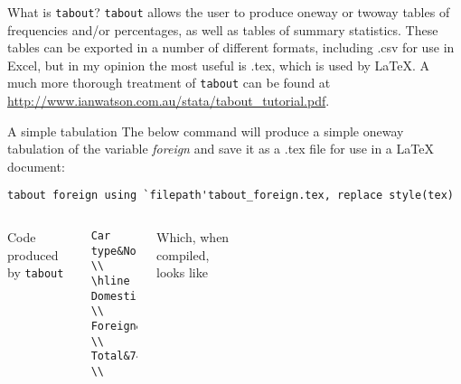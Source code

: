 \documentclass[fleqn, handout, 10pt]{beamer}
\def\results{S:/trainings/exporting_stata_tables_figures/results}
\def\lst{\lstinline}
\begin{document}
\begin{frame}[fragile]{What is \lst=tabout=?}
     \lst=tabout= allows the user to produce oneway or twoway tables of frequencies and/or percentages, as well as tables of summary statistics. These tables can be exported in a number of different formats, including .csv for use in Excel, but in my opinion the most useful is .tex, which is used by \LaTeX{}. A much more thorough treatment of \lst=tabout= can be found at \url{http://www.ianwatson.com.au/stata/tabout_tutorial.pdf}.
\end{frame}

\begin{frame}[fragile]{A simple tabulation}
    The below command will produce a simple oneway tabulation of the variable \emph{foreign} and save it as a .tex file for use in a \LaTeX{} document: \\
    \vspace{.25cm}
    \begin{lstlisting}
tabout foreign using `filepath'tabout_foreign.tex, replace style(tex)
    \end{lstlisting}
\pause
    \vspace{.25cm}
    \begin{columns}[t]
	 Code produced by \lst=tabout= \\
	    \begin{lstlisting}
Car type&No. \\
\hline
Domestic&52.0 \\
Foreign&22.0 \\
Total&74.0 \\
	    \end{lstlisting} \pause
	    Which, when compiled, looks like \\
	    \vspace{.25cm}
	    \begin{tabular}{lr}
		
	    \end{tabular}
    \end{columns}
\end{frame}
\end{document}
